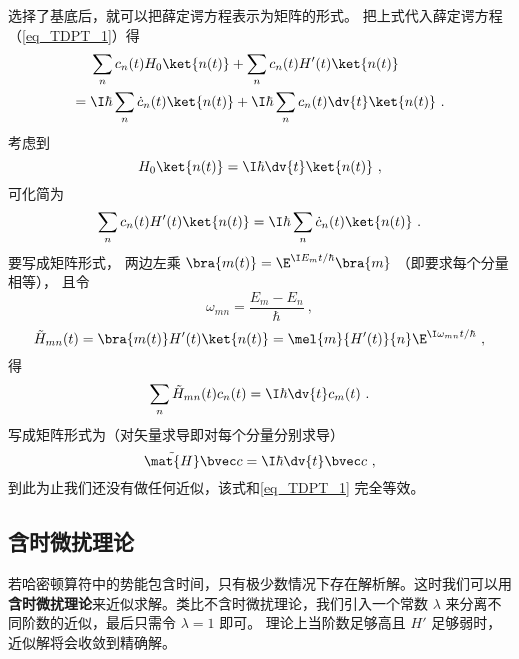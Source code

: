 选择了基底后，就可以把薛定谔方程表示为矩阵的形式。 %
把上式代入薛定谔方程（\autoref{eq_TDPT_1}）得
\begin{equation}
\begin{aligned}
&\sum_n c_n(t) H_0 \ket{n(t)} + \sum_n c_n(t) H'(t) \ket{n(t)} \\ 
={} &\I\hbar \sum_n \dot c_n(t) \ket{n(t)}
+ \I\hbar \sum_n c_n(t) \dv{t} \ket{n(t)}~.
\end{aligned}
\end{equation}
考虑到
\begin{equation}
H_0\ket{n(t)} = \I\hbar \dv{t} \ket{n(t)}~,
\end{equation}
可化简为
\begin{equation}\label{eq_TDPT_11}
\sum_n c_n(t) H'(t) \ket{n(t)}
= \I\hbar \sum_n \dot c_n(t) \ket{n(t)}~.
\end{equation}
要写成矩阵形式， 两边左乘 $\bra{m(t)} = \E^{\I E_m t/\hbar}\bra{m}$ （即要求每个分量相等）， 且令
\begin{equation}
\omega_{mn} = \frac{E_m-E_n}{\hbar}~,
\end{equation}
\begin{equation}\label{eq_TDPT_7}
\tilde H_{mn}(t) = \bra{m(t)} H'(t) \ket{n(t)} = \mel{m}{H'(t)}{n} \E^{\I\omega_{mn}t/\hbar}~,
\end{equation}
得
\begin{equation}\label{eq_TDPT_2}
\sum_n \tilde H_{mn}(t) c_n(t)
= \I\hbar \dv{t} c_m(t)~.
\end{equation}
写成矩阵形式为（对矢量求导即对每个分量分别求导）
\begin{equation}\label{eq_TDPT_3}
\tilde{\mat {H}} \bvec c = \I\hbar \dv{t} \bvec c~,
\end{equation}
到此为止我们还没有做任何近似，该式和\autoref{eq_TDPT_1} 完全等效。

\subsection{含时微扰理论}

若哈密顿算符中的势能包含时间，只有极少数情况下存在解析解。这时我们可以用\textbf{含时微扰理论}来近似求解。类比不含时微扰理论，我们引入一个常数 $\lambda$ 来分离不同阶数的近似，最后只需令 $\lambda = 1$ 即可。 理论上当阶数足够高且 $H'$ 足够弱时，近似解将会收敛到精确解。

